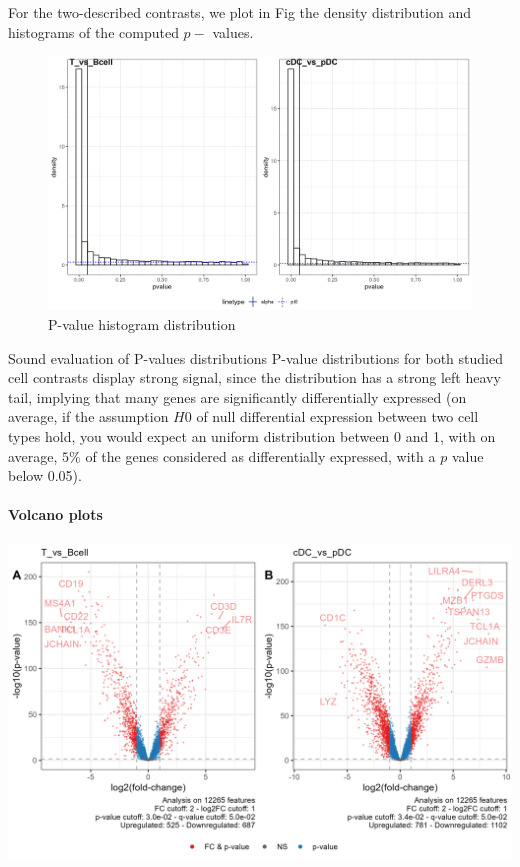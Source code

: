 For the two-described contrasts, we plot in Fig  the density distribution and histograms of the computed \(p-\) values.

\begin{figure}

{\centering \includegraphics[width=0.9\linewidth]{./figures/pvalues_distribution} 

}

\caption{P-value histogram distribution}\label{fig:p-values-distribution}
\end{figure}

\begin{conclusion}{Sound evaluation of P-values distributions}
P-value distributions for both studied cell contrasts display strong signal, since the distribution has a strong left heavy tail, implying that many genes are significantly differentially expressed (on average, if the assumption \(H0\) of null differential expression between two cell types hold, you would expect an uniform distribution between 0 and 1, with on average, \(5\%\) of the genes considered as differentially expressed, with a \(p\) value below 0.05).

\end{conclusion}


\paragraph{Volcano plots}
\label{volcano-plots}

\begin{center}\includegraphics[width=0.9\linewidth]{./figures/volcano_plots} \end{center}


